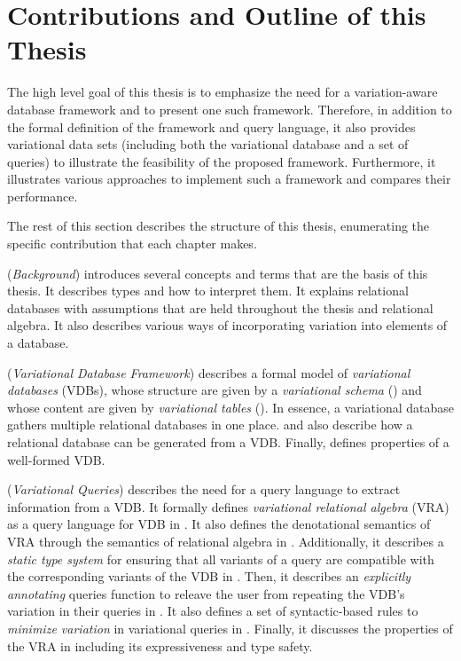 \section{Contributions and Outline of this Thesis}
\label{sec:contribution}

The high level goal of this thesis is to emphasize the need for a variation-aware database
framework and to present one such framework. Therefore, in addition to the formal 
definition of the framework and query language, it also provides variational data sets 
(including both the variational database and a set of queries) to illustrate the feasibility
of the proposed framework. Furthermore, it illustrates various approaches to implement
such a framework and compares their performance.

The rest of this section describes the structure of this thesis, enumerating the specific 
contribution that each chapter makes. 

 (\emph{Background}) introduces several concepts and terms that are the 
basis of this thesis. It describes types and how to interpret them. It explains relational
databases with assumptions that are held throughout the thesis and relational algebra. 
It also describes various ways of incorporating variation
into elements of a database. 

 (\emph{Variational Database Framework}) describes a formal model of
\emph{variational databases} (VDBs), whose
structure are given by a \emph{variational schema} () and whose content are given
by \emph{variational tables} ().
In essence, a variational database gathers multiple relational databases in one place.
 and  also describe how a relational database can be generated
from a VDB.
Finally,  defines properties of a well-formed VDB.

 (\emph{Variational Queries}) describes the need for a query language 
to extract information from a VDB. It formally defines 
\emph{variational relational algebra} (VRA) as a query language for
VDB in .
%
It also defines the denotational semantics of VRA through the semantics of
relational algebra in .
%
Additionally, it describes a \emph{static type system} for ensuring that all variants of a query are
compatible with the corresponding variants of the VDB in .
% 
Then, it describes an \emph{explicitly annotating} queries function to releave the 
user from repeating the VDB's variation in their queries in .
%
It also defines a set of syntactic-based rules to \emph{minimize variation} in 
variational queries in .
%
Finally, it discusses the properties of the VRA in  including its expressiveness and 
type safety. 

